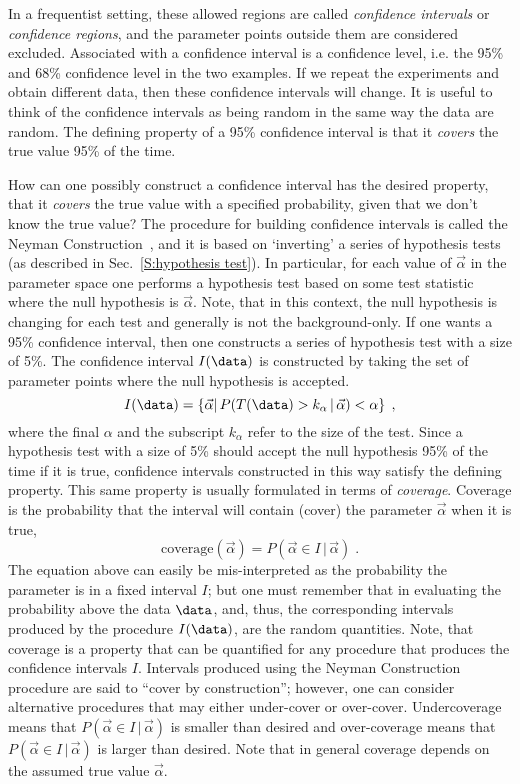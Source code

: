 In a frequentist setting, these allowed regions are called \textit{confidence intervals} or \textit{confidence regions}, and the parameter points outside them are considered excluded.  Associated with a confidence interval is a confidence level, i.e. the 95\% and 68\% confidence level in the two examples.  If we repeat the experiments and obtain different data, then these confidence intervals will change.  It is useful to think of the confidence intervals as being random  in the same way the data are random.  The defining property of a 95\% confidence interval is that it \textit{covers} the true value 95\% of the time.  


How can one possibly construct a confidence interval has the desired property, that it \textit{covers} the true value with a specified probability, given that we don't know the true value?  The procedure for building confidence intervals is called the Neyman Construction~\cite{Neyman}, and it is based on `inverting' a series of hypothesis tests (as described in Sec.~\ref{S:hypothesis test}).  In particular, for each value of $\vec\alpha$ in the parameter space one performs a hypothesis test based on some test statistic where the null hypothesis is $\vec\alpha$.  Note, that in this context, the null hypothesis is changing for each test and generally is not the background-only.  If one wants a 95\% confidence interval, then one constructs a series of hypothesis test with a size of 5\%.  The confidence interval $I(\data)$ is constructed by taking the set of parameter points where the null hypothesis is accepted. 
\begin{equation}
I(\data) = \left\{ \vec\alpha \middle |\, P(T(\data)>k_\alpha \,|\, \vec\alpha) < \alpha \right\} \;,
\end{equation}
where the final $\alpha$ and the subscript $k_\alpha$ refer to the size of the test.
Since a hypothesis test with a size of 5\% should accept the null hypothesis 95\% of the time if it is true, confidence intervals constructed in this way satisfy the defining property.  This same property is usually formulated in terms of \textit{coverage}.  Coverage is the probability that the interval will contain (cover) the parameter $\vec\alpha$ when it is true,
\begin{equation}
\textrm{coverage}(\vec\alpha) = P(\vec\alpha \in I\, |\, \vec\alpha) \; .
\end{equation}
The equation above can easily be mis-interpreted as the probability the parameter is in a fixed interval $I$; but one must remember that in evaluating the probability above the data $\data$, and, thus, the corresponding intervals produced by the procedure $I(\data)$, are the random quantities.  
Note, that coverage is a property that can be  quantified for any procedure that produces the confidence intervals $I$.  Intervals produced using the Neyman Construction procedure are said to ``cover by construction''; however, one can consider alternative procedures that may either under-cover or over-cover.  Undercoverage means that \mbox{$P(\vec\alpha \in I\, |\, \vec\alpha)$} is smaller than desired and over-coverage means that $P(\vec\alpha \in I\, |\, \vec\alpha)$ is larger than desired.  Note that in general coverage depends on the assumed true value $\vec\alpha$.


